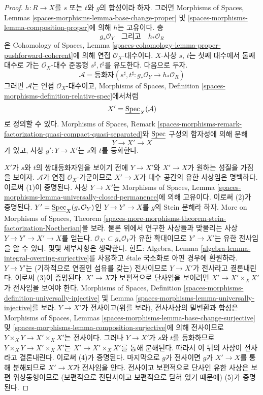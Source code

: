 \begin{proof}
$h : R \to X$를 $s$ 또는 $t$와 $g$의 합성이라 하자. 그러면
Morphisms of Spaces, Lemmas
\ref{spaces-morphisms-lemma-base-change-proper} 및
\ref{spaces-morphisms-lemma-composition-proper}에 의해 $h$는 고유이다.
층
$$
g_*\mathcal{O}_Y
\quad\text{그리고}\quad
h_*\mathcal{O}_R
$$
은 Cohomology of Spaces, Lemma
\ref{spaces-cohomology-lemma-proper-pushforward-coherent}에 의해
연접 $\mathcal{O}_X$-대수이다. $X$-사상 $s$, $t$는 첫째 대수에서
둘째 대수로 가는 $\mathcal{O}_X$-대수 준동형 $s^\sharp, t^\sharp$를
유도한다. 다음으로 두자.
$$
\mathcal{A} = \text{등화자}\left(s^\sharp, t^\sharp :
g_*\mathcal{O}_Y \longrightarrow h_*\mathcal{O}_R\right)
$$
그러면 $\mathcal{A}$는 연접 $\mathcal{O}_X$-대수이고,
Morphisms of Spaces, Definition
\ref{spaces-morphisms-definition-relative-spec}에서처럼
$$
X' = \underline{\mathop{\mathrm{Spec}}}_X(\mathcal{A})
$$
로 정의할 수 있다. Morphisms of Spaces, Remark
\ref{spaces-morphisms-remark-factorization-quasi-compact-quasi-separated}와
$\underline{\mathop{\mathrm{Spec}}}$ 구성의 함자성에 의해 분해
$$
Y \longrightarrow X' \longrightarrow X
$$
가 있고, 사상 $g' : Y \to X'$는 $s$와 $t$를 등화한다.

\medskip\noindent
$X'$가 $s$와 $t$의 쌍대등화자임을 보이기 전에 $Y \to X'$와
$X' \to X$가 원하는 성질을 가짐을 보이자. $\mathcal{A}$가 연접
$\mathcal{O}_X$-가군이므로 $X' \to X$가 대수 공간의 유한 사상임은
명백하다. 이로써 (1)이 증명된다. 사상 $Y \to X'$는 Morphisms of Spaces,
Lemma \ref{spaces-morphisms-lemma-universally-closed-permanence}에 의해
고유이다. 이로써 (2)가 증명된다. $Y' =
\underline{\mathop{\mathrm{Spec}}}_X(g_*\mathcal{O}_Y)$인 $Y \to Y' \to X$를 $g$의
Stein 분해라 하자. More on Morphisms of Spaces, Theorem
\ref{spaces-more-morphisms-theorem-stein-factorization-Noetherian}을 보라.
물론 위에서 연구한 사상들과 맞물리는 사상
$Y \to Y' \to X' \to X$를 얻는다.
$\mathcal{O}_{X'} \subset g_*\mathcal{O}_Y$가 유한 확대이므로
$Y' \to X'$는 유한 전사임을 알 수 있다. 몇몇 세부사항은 생략한다.
힌트: Algebra, Lemma \ref{algebra-lemma-integral-overring-surjective}를
사용하고 \'etale 국소화로 아핀 경우에 환원하라. $Y \to Y'$는
(기하적으로 연결인 섬유를 갖는) 전사이므로 $Y \to X'$가 전사라고
결론내린다. 이로써 (3)이 증명된다. $X' \to X$가 보편적으로
단사임을 보이려면 $X' \to X' \times_X X'$가 전사임을 보여야 한다.
Morphisms of Spaces, Definition
\ref{spaces-morphisms-definition-universally-injective} 및 Lemma
\ref{spaces-morphisms-lemma-universally-injective}를 보라. $Y \to X'$가
전사이고(위를 보라), 전사사상의 밑변환과 합성은 Morphisms of Spaces,
Lemmas \ref{spaces-morphisms-lemma-base-change-surjective} 및
\ref{spaces-morphisms-lemma-composition-surjective}에 의해 전사이므로
$Y \times_X Y \to X' \times_X X'$는 전사이다. 그러나 $Y \to X'$가
$s$와 $t$를 등화하므로 $Y \times_X Y \to X' \times_X X'$는
$X' \to X' \times_X X'$를 통해 분해된다. 따라서 이 뒤의 사상이
전사라고 결론내린다. 이로써 (4)가 증명된다. 마지막으로 $g$가 전사이면
$g$가 $X' \to X$를 통해 분해되므로 $X' \to X$가 전사임을 안다.
전사이고 보편적으로 단사인 유한 사상은 보편 위상동형이므로
(보편적으로 전단사이고 보편적으로 닫혀 있기 때문에) (5)가 증명된다.


\end{proof}
